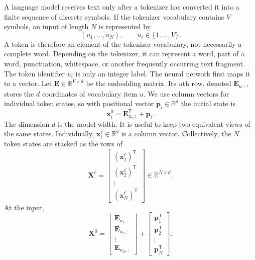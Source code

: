 \documentclass[11pt]{article}
\begin{document}
A language model receives text only after a tokenizer has converted it into a finite sequence of discrete symbols. If the tokenizer vocabulary contains $V$ symbols, an input of length $N$ is represented by
\begin{equation}
(u_1,\ldots,u_N),
\qquad
u_i\in\{1,\ldots,V\}.
\end{equation}
A token is therefore an element of the tokenizer vocabulary, not necessarily a complete word. Depending on the tokenizer, it can represent a word, part of a word, punctuation, whitespace, or another frequently occurring text fragment. The token identifier $u_i$ is only an integer label. The neural network first maps it to a vector. Let $\mathbf E\in\mathbb R^{V\times d}$ be the embedding matrix. Its $u$th row, denoted $\mathbf E_{u,:}$, stores the $d$ coordinates of vocabulary item $u$. We use column vectors for individual token states, so with positional vector $\mathbf p_i\in\mathbb R^d$ the initial state is
\begin{equation}
\mathbf x_i^0
=
\mathbf E_{u_i,:}^{\mathsf T}
+
\mathbf p_i.
\label{eq:embedding}
\end{equation}
The dimension $d$ is the model width. It is useful to keep two equivalent views of the same states. Individually, $\mathbf x_i^\ell\in\mathbb R^d$ is a column vector. Collectively, the $N$ token states are stacked as the rows of
\begin{equation}
\mathbf X^\ell
=
\begin{bmatrix}
(\mathbf x_1^\ell)^{\mathsf T}\\
(\mathbf x_2^\ell)^{\mathsf T}\\
\vdots\\
(\mathbf x_N^\ell)^{\mathsf T}
\end{bmatrix}
\in\mathbb R^{N\times d}.
\label{eq:stacked-state}
\end{equation}
At the input,
\begin{equation}
\mathbf X^0
=
\begin{bmatrix}
\mathbf E_{u_1,:}\\
\mathbf E_{u_2,:}\\
\vdots\\
\mathbf E_{u_N,:}
\end{bmatrix}
+
\begin{bmatrix}
\mathbf p_1^{\mathsf T}\\
\mathbf p_2^{\mathsf T}\\
\vdots\\
\mathbf p_N^{\mathsf T}
\end{bmatrix}.
\label{eq:stacked-embedding}
\end{equation}
\end{document}
